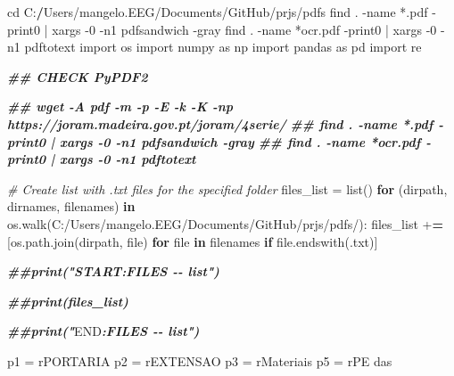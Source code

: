 \documentclass[
  12pt,
]{article}
\newenvironment{Shaded}{\begin{snugshade}}{\end{snugshade}}
\newcommand{\CommentTok}[1]{\textcolor[rgb]{0.56,0.35,0.01}{\textit{#1}}}
\newcommand{\ControlFlowTok}[1]{\textcolor[rgb]{0.13,0.29,0.53}{\textbf{#1}}}
\newcommand{\DecValTok}[1]{\textcolor[rgb]{0.00,0.00,0.81}{#1}}
\newcommand{\DocumentationTok}[1]{\textcolor[rgb]{0.56,0.35,0.01}{\textbf{\textit{#1}}}}
\newcommand{\ErrorTok}[1]{\textcolor[rgb]{0.64,0.00,0.00}{\textbf{#1}}}
\newcommand{\FunctionTok}[1]{\textcolor[rgb]{0.00,0.00,0.00}{#1}}
\newcommand{\NormalTok}[1]{#1}
\newcommand{\OtherTok}[1]{\textcolor[rgb]{0.56,0.35,0.01}{#1}}
\newcommand{\RegionMarkerTok}[1]{#1}
\newcommand{\SpecialCharTok}[1]{\textcolor[rgb]{0.00,0.00,0.00}{#1}}
\newcommand{\StringTok}[1]{\textcolor[rgb]{0.31,0.60,0.02}{#1}}
\begin{document}
\begin{Shaded}
\begin{Highlighting}[]
\NormalTok{  cd C}\SpecialCharTok{:}\ErrorTok{/}\NormalTok{Users}\SpecialCharTok{/}\NormalTok{mangelo.EEG}\SpecialCharTok{/}\NormalTok{Documents}\SpecialCharTok{/}\NormalTok{GitHub}\SpecialCharTok{/}\NormalTok{prjs}\SpecialCharTok{/}\NormalTok{pdfs}
\NormalTok{    find . }\SpecialCharTok{{-}}\NormalTok{name }\StringTok{\textquotesingle{}*.pdf\textquotesingle{}} \SpecialCharTok{{-}}\NormalTok{print0 }\SpecialCharTok{|}\NormalTok{ xargs }\SpecialCharTok{{-}}\DecValTok{0} \SpecialCharTok{{-}}\NormalTok{n1 pdfsandwich }\SpecialCharTok{{-}}\NormalTok{gray}
\NormalTok{    find . }\SpecialCharTok{{-}}\NormalTok{name }\StringTok{\textquotesingle{}*ocr.pdf\textquotesingle{}} \SpecialCharTok{{-}}\NormalTok{print0 }\SpecialCharTok{|}\NormalTok{ xargs }\SpecialCharTok{{-}}\DecValTok{0} \SpecialCharTok{{-}}\NormalTok{n1 pdftotext}
\NormalTok{import os}
\NormalTok{import numpy as np}
\NormalTok{import pandas as pd}
\NormalTok{import re}

\DocumentationTok{\#\# CHECK PyPDF2}

\DocumentationTok{\#\# wget {-}A pdf {-}m {-}p {-}E {-}k {-}K {-}np https://joram.madeira.gov.pt/joram/4serie/}
\DocumentationTok{\#\# find . {-}name \textquotesingle{}*.pdf\textquotesingle{} {-}print0 | xargs {-}0 {-}n1 pdfsandwich {-}gray}
\DocumentationTok{\#\# find . {-}name \textquotesingle{}*ocr.pdf\textquotesingle{} {-}print0 | xargs {-}0 {-}n1 pdftotext}

\CommentTok{\# Create list with .txt files for the specified folder}
\NormalTok{files\_list }\OtherTok{=} \FunctionTok{list}\NormalTok{()}
\ControlFlowTok{for}\NormalTok{ (dirpath, dirnames, filenames) }\ControlFlowTok{in} \FunctionTok{os.walk}\NormalTok{(}\StringTok{\textquotesingle{}C:/Users/mangelo.EEG/Documents/GitHub/prjs/pdfs/\textquotesingle{}}\NormalTok{)}\SpecialCharTok{:}
\NormalTok{    files\_list }\SpecialCharTok{+}\ErrorTok{=}\NormalTok{ [}\FunctionTok{os.path.join}\NormalTok{(dirpath, file)}
                   \ControlFlowTok{for}\NormalTok{ file }\ControlFlowTok{in}\NormalTok{ filenames }\ControlFlowTok{if} \FunctionTok{file.endswith}\NormalTok{(}\StringTok{\textquotesingle{}.txt\textquotesingle{}}\NormalTok{)]}


\DocumentationTok{\#\#print("START:FILES {-}{-} list")}

\DocumentationTok{\#\#print(files\_list)}

\DocumentationTok{\#\#print("}\RegionMarkerTok{END}\DocumentationTok{:FILES {-}{-} list")}

\NormalTok{p1 }\OtherTok{=}\NormalTok{ r}\StringTok{\textquotesingle{}PORTARIA\textquotesingle{}}
\NormalTok{p2 }\OtherTok{=}\NormalTok{ r}\StringTok{\textquotesingle{}EXTENSAO\textquotesingle{}}
\NormalTok{p3 }\OtherTok{=}\NormalTok{ r}\StringTok{\textquotesingle{}Materiais\textquotesingle{}}
\NormalTok{p5 }\OtherTok{=}\NormalTok{ r}\StringTok{\textquotesingle{}PE das\textquotesingle{}}


\end{Highlighting}
\end{Shaded}
\end{document}
